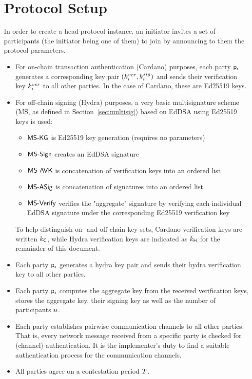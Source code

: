 \clearpage
\section{Protocol Setup}\label{sec:setup}
In order to create a head-protocol instance, an initiator invites a set of
participants (the initiator being one of them) to join by announcing to them the
protocol parameters.

\begin{itemize}
	\item For on-chain transaction authentication (Cardano) purposes, each party
	      $\mathsf p_i$ generates a corresponding key pair $(k^{ver}_{i},k^{sig}_{i})$
	      and sends their verification key $k^{ver}_{i}$ to all other parties. In
	      the case of Cardano, these are Ed25519 keys.

	\item For off-chain signing (Hydra) purposes, a very basic multisignature scheme (MS, as defined in Section~\ref{sec:multisig}) based on EdDSA using Ed25519 keys is used:
	      \begin{itemize}
		      \item $\mathsf{MS\textsf{-}{}KG}$ is Ed25519 key generation (requires no parameters)
		      \item $\mathsf{MS\textsf{-}{}Sign}$ creates an EdDSA signature
		      \item $\mathsf{MS\textsf{-}{}AVK}$ is concatenation of verification keys into an ordered list
		      \item $\mathsf{MS\textsf{-}{}ASig}$ is concatenation of signatures into an ordered list
		      \item $\mathsf{MS\textsf{-}{}Verify}$ verifies the "aggregate" signature by verifying each individual EdDSA signature under the corresponding Ed25519 verification key
	      \end{itemize}

        To help distinguish on- and off-chain key sets, Cardano verification
        keys are written $k_\mathsf{C}$, while Hydra verification keys are
        indicated as $k_{\mathsf{H}}$ for the remainder of this document.
        

	\item Each party $\mathsf p_i$ generates a hydra key pair and sends their hydra verification key to all other parties.

	\item Each party $\mathsf p_i$ computes the aggregate key from the received verification keys, stores the aggregate key,
	      their signing key as well as the number of participants $n$.

	\item Each party establishes pairwise communication channels to all other parties. That is, every network message received from a specific party is checked for (channel) authentication. It is the implementer’s duty to find a suitable authentication process for the communication channels.

	\item All parties agree on a contestation period $T$.
\end{itemize}

